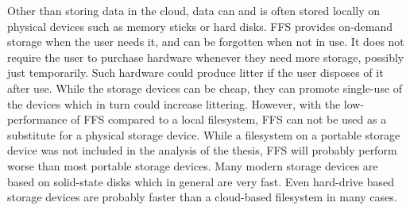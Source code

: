 Other than storing data in the cloud, data can and is often stored locally on physical devices such as memory sticks or hard disks. \gls{FFS} provides \mbox{on-demand} storage when the user needs it, and can be forgotten when not in use. It does not require the user to purchase hardware whenever they need more storage, possibly just temporarily. Such hardware could produce litter if the user disposes of it after use. While the storage devices can be cheap, they can promote \mbox{single-use} of the devices which in turn could increase littering. However, with the low-performance of \gls{FFS} compared to a local filesystem, \gls{FFS} can not be used as a substitute for a physical storage device. While a filesystem on a portable storage device was not included in the analysis of the thesis, \gls{FFS} will probably perform worse than most portable storage devices. Many modern storage devices are based on solid-state disks which in general are very fast. Even hard-drive based storage devices are probably faster than a \mbox{cloud-based} filesystem in many cases.

